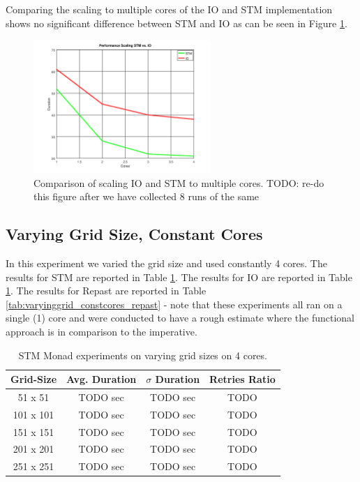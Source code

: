 Comparing the scaling to multiple cores of the IO and STM implementation shows no significant difference between STM and IO as can be seen in Figure \ref{fig:core_duration_stm_io}.

\begin{figure}
	\centering
	\includegraphics[width=0.6\textwidth, angle=0]{./fig/core_duration_stm_io.png}
	\caption{Comparison of scaling IO and STM  to multiple cores. TODO: re-do this figure after we have collected 8 runs of the same}
	\label{fig:core_duration_stm_io}
\end{figure}

\subsection{Varying Grid Size, Constant Cores}
In this experiment we varied the grid size and used constantly 4 cores. The results for STM are reported in Table \ref{tab:varyinggrid_constcores_stm}. The results for IO are reported in Table \ref{tab:varyinggrid_constcores_stm}. The results for Repast are reported in Table \ref{tab:varyinggrid_constcores_repast} - note that these experiments all ran on a single (1) core and were conducted to have a rough estimate where the functional approach is in comparison to the imperative.

\begin{table}
	\centering
  	\begin{tabular}{ c || c | c | c }
        Grid-Size & Avg. Duration & $\sigma$ Duration & Retries Ratio \\ \hline \hline 
   		51 x 51   & TODO sec & TODO sec & TODO \\ \hline
   		101 x 101 & TODO sec & TODO sec & TODO \\ \hline
   		151 x 151 & TODO sec & TODO sec & TODO \\ \hline
   		201 x 201 & TODO sec & TODO sec & TODO \\ \hline 
   		251 x 251 & TODO sec & TODO sec & TODO \\ \hline
  	\end{tabular}
  	
  	\caption{STM Monad experiments on varying grid sizes on 4 cores.}
	\label{tab:varyinggrid_constcores_stm}
\end{table}

